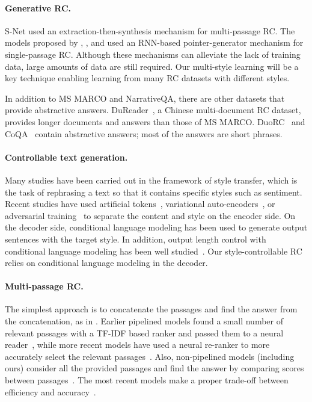 \documentclass[11pt,a4paper]{article}
\theoremstyle{mydef}
\theoremstyle{myprob}
\begin{document}
\paragraph{Generative RC.} 

S-Net \citep{TanWYDLZ18} 
used an extraction-then-synthesis mechanism for multi-passage RC. 
The models proposed by \citet{McCannKXS18}, \citet{BauerWB18}, and \citet{IndurthiYBC18} used an RNN-based pointer-generator mechanism for single-passage RC.
Although these mechanisms can alleviate the lack of training data, 
large amounts of data are still required. Our multi-style learning will be a key technique enabling learning from many RC datasets with different styles.

In addition to MS MARCO and NarrativeQA, 
there are other datasets that provide abstractive answers. 
DuReader~\citep{HeLLLZXLWWSLWW18}, a Chinese multi-document RC
dataset, provides longer documents and answers than those of MS MARCO.
DuoRC~\citep{KhapraSSA18} and CoQA~\citep{ReddyCM18} contain abstractive answers;  most of the answers are 
short phrases.

\paragraph{Controllable text generation.}

Many studies have been carried out in the framework of style transfer, which is the task of rephrasing a text so that it contains specific styles such as sentiment. 
Recent studies have used artificial tokens~\citep{SennrichHB16,JohnsonSLKWCTVW17}, variational auto-encoders~\citep{HuYLSX17}, or adversarial training~\citep{FuTPZY18,TsvetkovBSP18}
to separate the content and style on the encoder side. 
On the decoder side, conditional language modeling has been used to generate output sentences with the target style.
In addition,
output length control with conditional language modeling has been well studied~\citep{KikuchiNSTO16,TakenoNY17,FanGA18}. Our style-controllable RC relies on conditional language modeling in the decoder. 

\paragraph{Multi-passage RC.} 

The simplest approach is to concatenate the passages and find the answer from the concatenation, as in \citep{WangYWCZ17}. Earlier pipelined models found a small number of relevant passages with a TF-IDF based ranker and passed them to a neural reader~\citep{ChenFWB17,GardnerC18}, while more recent 
models have used a neural re-ranker to more accurately select the relevant passages~\citep{WangAAAI2018,NishidaSOAT18}. 
Also, non-pipelined models (including ours) consider all the provided passages and find the answer by comparing scores between passages~\citep{TanWYDLZ18,WuWLHWLLL18}.  The most recent models make a proper trade-off between efficiency and accuracy~\citep{YanAAAI19,MinZSX18}.
\end{document}
